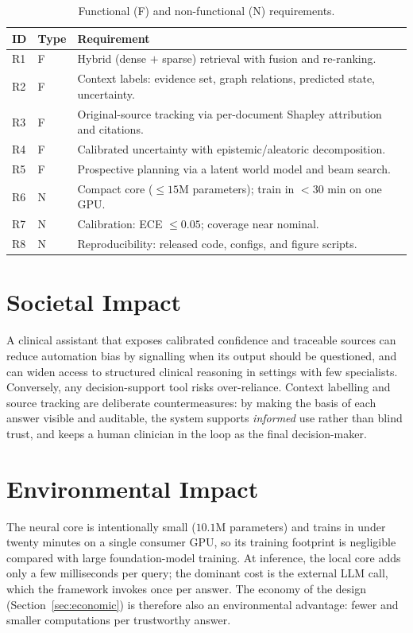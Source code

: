 \documentclass[11pt,a4paper]{report}
\begin{document}
\begin{table}[H]
\caption{Functional (F) and non-functional (N) requirements.}
\label{tab:requirements}
\centering
\small
\begin{tabular}{llp{8.2cm}}
\toprule
\textbf{ID} & \textbf{Type} & \textbf{Requirement}\\
\midrule
R1 & F & Hybrid (dense $+$ sparse) retrieval with fusion and re-ranking.\\
R2 & F & Context labels: evidence set, graph relations, predicted state,
         uncertainty.\\
R3 & F & Original-source tracking via per-document Shapley attribution and
         citations.\\
R4 & F & Calibrated uncertainty with epistemic/aleatoric decomposition.\\
R5 & F & Prospective planning via a latent world model and beam search.\\
R6 & N & Compact core ($\le$$15$M parameters); train in $<$$30$ min on one GPU.\\
R7 & N & Calibration: ECE $\le 0.05$; coverage near nominal.\\
R8 & N & Reproducibility: released code, configs, and figure scripts.\\
\bottomrule
\end{tabular}
\end{table}

\section{Societal Impact}
A clinical assistant that exposes calibrated confidence and traceable sources
can reduce automation bias by signalling when its output should be questioned,
and can widen access to structured clinical reasoning in settings with few
specialists. Conversely, any decision-support tool risks over-reliance.
Context labelling and source tracking are deliberate countermeasures: by making
the basis of each answer visible and auditable, the system supports
\emph{informed} use rather than blind trust, and keeps a human clinician in the
loop as the final decision-maker.

\section{Environmental Impact}
The neural core is intentionally small ($10.1$M parameters) and trains in under
twenty minutes on a single consumer GPU, so its training footprint is negligible
compared with large foundation-model training. At inference, the local core adds
only a few milliseconds per query; the dominant cost is the external LLM call,
which the framework invokes once per answer. The economy of the design
(Section~\ref{sec:economic}) is therefore also an environmental advantage:
fewer and smaller computations per trustworthy answer.
\end{document}
